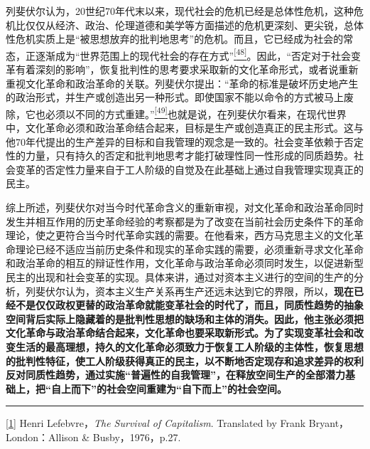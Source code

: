 \documentclass[UTF8, fontset = sourcesans, a4paper, oneside, zihao =
-4, scheme=chinese, no-math, space=true]{ctexbook}
\begin{document}
列斐伏尔认为，20世纪70年代末以来，现代社会的危机已经是总体性危机，这种危机比仅仅从经济、政治、伦理道德和美学等方面描述的危机更深刻、更尖锐，总体性危机实质上是``被思想放弃的批判地思考''的危机。而且，它已经成为社会的常态，正逐渐成为``世界范围上的现代社会的存在方式''\protect\hypertarget{part0008_split_003.htmlux5cux23w48}{}{}\protect\hyperlink{part0008_split_003.htmlux5cux23m48}{\textsuperscript{{[}48{]}}}。因此，``否定对于社会变革有着深刻的影响''，恢复批判性的思考要求采取新的文化革命形式，或者说重新重视文化革命和政治革命的关联。列斐伏尔提出：``革命的标准是破坏历史地产生的政治形式，并生产或创造出另一种形式。即使国家不能以命令的方式被马上废除，它也必须以不同的方式重建。''\protect\hypertarget{part0008_split_003.htmlux5cux23w49}{}{}\protect\hyperlink{part0008_split_003.htmlux5cux23m49}{\textsuperscript{{[}49{]}}}也就是说，在列斐伏尔看来，在现代世界中，文化革命必须和政治革命结合起来，目标是生产或创造真正的民主形式。这与他70年代提出的生产差异的目标和自我管理的观念是一致的。社会变革依赖于否定性的力量，只有持久的否定和批判地思考才能打破理性同一性形成的同质趋势。社会变革的否定性力量来自于工人阶级的自觉及在此基础上通过自我管理实现真正的民主。

综上所述，列斐伏尔对当今时代革命含义的重新审视，对文化革命和政治革命同时发生并相互作用的历史革命经验的考察都是为了改变在当前社会历史条件下的革命理论，使之更符合当今时代革命实践的需要。在他看来，西方马克思主义的文化革命理论已经不适应当前历史条件和现实的革命实践的需要，必须重新寻求文化革命和政治革命的相互的辩证性作用，文化革命与政治革命必须同时发生，以促进新型民主的出现和社会变革的实现。具体来讲，通过对资本主义进行的空间的生产的分析，列斐伏尔认为，资本主义生产关系再生产还远未达到它的界限，所以，\textbf{现在已经不是仅仅政权更替的政治革命就能变革社会的时代了，而且，同质性趋势的抽象空间背后实际上隐藏着的是批判性思想的缺场和主体的消失。因此，他主张必须把文化革命与政治革命结合起来，文化革命也要采取新形式。为了实现变革社会和改变生活的最高理想，持久的文化革命必须致力于恢复工人阶级的主体性，恢复思想的批判性特征，使工人阶级获得真正的民主，以不断地否定现存和追求差异的权利反对同质性趋势，通过实施``普遍性的自我管理''，在释放空间生产的全部潜力基础上，把``自上而下''的社会空间重建为``自下而上''的社会空间。}

\begin{center}\rule{0.5\linewidth}{\linethickness}\end{center}

\protect\hypertarget{part0008_split_003.htmlux5cux23m1}{}{}\protect\hyperlink{part0008_split_000.htmlux5cux23w1}{{[}1{]}}
Henri Lefebvre，\emph{The Survival of Capitalism}. Translated by Frank
Bryant，London：Allison \& Busby，1976，p.27.
\end{document}
